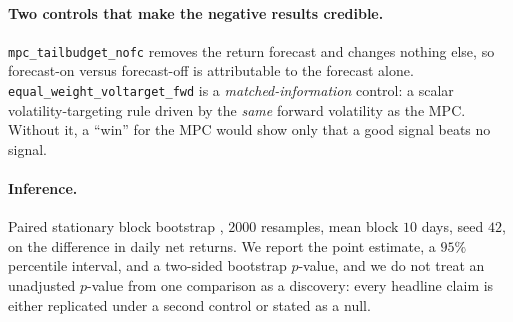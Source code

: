 \documentclass[journal]{IEEEtran}
\begin{document}
\paragraph{Two controls that make the negative results credible.}
\texttt{mpc\_tailbudget\_nofc} removes the return forecast and changes nothing
else, so forecast-on versus forecast-off is attributable to the forecast alone.
\texttt{equal\_weight\_voltarget\_fwd} is a \emph{matched-information} control: a
scalar volatility-targeting rule driven by the \emph{same} forward volatility as
the MPC. Without it, a ``win'' for the MPC would show only that a good signal
beats no signal.

\paragraph{Inference.} Paired stationary block bootstrap
\cite{politis1994stationary}, $2000$ resamples, mean block $10$ days, seed $42$,
on the difference in daily net returns. We report the point estimate, a $95\%$
percentile interval, and a two-sided bootstrap $p$-value, and we do not treat an
unadjusted $p$-value from one comparison as a discovery: every headline claim is
either replicated under a second control or stated as a null.
\end{document}
